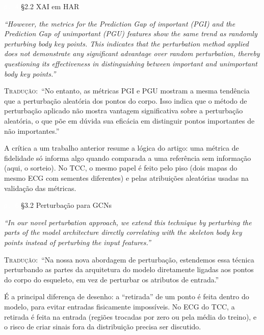 \documentclass[11pt,a4paper]{article}
\newcommand{\pagechip}[1]{{\setlength{\fboxsep}{1.5pt}\colorbox{cAcc}{\textcolor{white}{\scriptsize\texttt{#1}}}}}
\newenvironment{origquote}{\par\itshape\small}{\par}
\newenvironment{tradquote}{\par\small\textsc{Tradução:}\ }{\par}
\newcommand{\explab}[1]{\par\smallskip{\small\color{cAcc}\textbf{\MakeUppercase{#1}}}\par}
\begin{document}
\begin{citacard}{\pagechip{p. 4} §2.2 XAI em HAR}
\begin{origquote}“However, the metrics for the Prediction Gap of important (PGI) and the Prediction Gap of unimportant (PGU) features show the same trend as randomly perturbing body key points. This indicates that the perturbation method applied does not demonstrate any significant advantage over random perturbation, thereby questioning its effectiveness in distinguishing between important and unimportant body key points.”\end{origquote}
\begin{tradquote}“No entanto, as métricas PGI e PGU mostram a mesma tendência que a perturbação aleatória dos pontos do corpo. Isso indica que o método de perturbação aplicado não mostra vantagem significativa sobre a perturbação aleatória, o que põe em dúvida sua eficácia em distinguir pontos importantes de não importantes.”\end{tradquote}
\explab{Explicação}
A crítica a um trabalho anterior resume a lógica do artigo: uma métrica de fidelidade só informa algo quando comparada a uma referência sem informação (aqui, o sorteio). No TCC, o mesmo papel é feito pelo piso (dois mapas do mesmo ECG com sementes diferentes) e pelas atribuições aleatórias usadas na validação das métricas.
\end{citacard}

\begin{citacard}{\pagechip{p. 6} §3.2 Perturbação para GCNs}
\begin{origquote}“In our novel perturbation approach, we extend this technique by perturbing the parts of the model architecture directly correlating with the skeleton body key points instead of perturbing the input features.”\end{origquote}
\begin{tradquote}“Na nossa nova abordagem de perturbação, estendemos essa técnica perturbando as partes da arquitetura do modelo diretamente ligadas aos pontos do corpo do esqueleto, em vez de perturbar os atributos de entrada.”\end{tradquote}
\explab{Explicação}
É a principal diferença de desenho: a “retirada” de um ponto é feita dentro do modelo, para evitar entradas fisicamente impossíveis. No ECG do TCC, a retirada é feita na entrada (regiões trocadas por zero ou pela média do treino), e o risco de criar sinais fora da distribuição precisa ser discutido.
\end{citacard}
\end{document}
